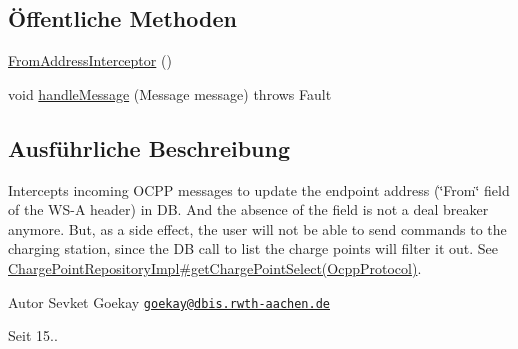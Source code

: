 \subsection*{Öffentliche Methoden}
\begin{DoxyCompactItemize}
\item 
\hyperlink{classde_1_1rwth_1_1idsg_1_1steve_1_1ocpp_1_1soap_1_1_from_address_interceptor_abbbe56bdd995abd805ade64990ceaccb}{From\-Address\-Interceptor} ()
\item 
void \hyperlink{classde_1_1rwth_1_1idsg_1_1steve_1_1ocpp_1_1soap_1_1_from_address_interceptor_a465f27cff6ca77abe462e05d4f5c545a}{handle\-Message} (Message message)  throws Fault 
\end{DoxyCompactItemize}


\subsection{Ausführliche Beschreibung}
Intercepts incoming O\-C\-P\-P messages to update the endpoint address (\char`\"{}\-From\char`\"{} field of the W\-S-\/\-A header) in D\-B. And the absence of the field is not a deal breaker anymore. But, as a side effect, the user will not be able to send commands to the charging station, since the D\-B call to list the charge points will filter it out. See \hyperlink{classde_1_1rwth_1_1idsg_1_1steve_1_1repository_1_1impl_1_1_charge_point_repository_impl_a1d92ac9f5e6804fff149aa0d74e33834}{Charge\-Point\-Repository\-Impl\#get\-Charge\-Point\-Select(\-Ocpp\-Protocol)}.

\begin{DoxyAuthor}{Autor}
Sevket Goekay \href{mailto:goekay@dbis.rwth-aachen.de}{\tt goekay@dbis.\-rwth-\/aachen.\-de} 
\end{DoxyAuthor}
\begin{DoxySince}{Seit}
15.. 
\end{DoxySince}


